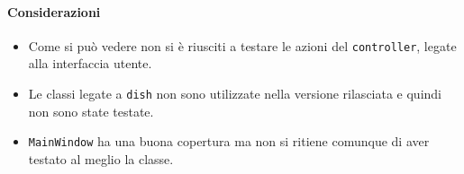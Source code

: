 \documentclass{article}
\begin{document}
\paragraph{Considerazioni}
\begin{itemize}
    \item Come si può vedere non si è riusciti a testare le azioni del \texttt{controller}, legate alla interfaccia utente.
    \item Le classi legate a \texttt{dish} non sono utilizzate nella versione rilasciata e quindi non sono state testate.
    \item \texttt{MainWindow} ha una buona copertura ma non si ritiene comunque di aver testato al meglio la classe.
\end{itemize}
\end{document}
